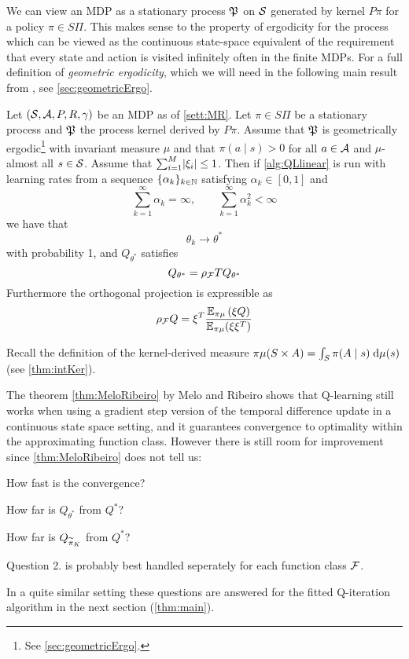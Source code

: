 We can view an MDP as a stationary process $\mathfrak{P}$ on $\mathcal{S}$
generated by kernel $P\pi$ for a policy $\pi \in S\Pi$.
This makes sense to the property of ergodicity for the process
which can be viewed as the continuous state-space equivalent of
the requirement that every state and action is visited infinitely often
in the finite MDPs.
For a full definition of \emph{geometric ergodicity}, which we will need
in the following main result from , see \cref{sec:geometricErgo}.

\begin{thm}
  Let $(\mathcal{S}, \mathcal{A}, P, R, \gamma)$ be an MDP as of \cref{sett:MR}.
  Let $\pi \in S\Pi$ be a stationary process
  and $\mathfrak{P}$ the process kernel derived by $P\pi$.
  Assume that $\mathfrak{P}$ is geometrically
  ergodic\footnote{See \cref{sec:geometricErgo}.} with invariant
  measure $\mu$ and that
  $\pi(a \mid s) > 0$ for all $a \in \mathcal{A}$ and $\mu$-almost all
  $s \in \mathcal{S}$.
  Assume that $\sum_{i=1}^M \abs{\xi_i} \leq 1$.
  Then if \cref{alg:QLlinear} is run with learning rates from a sequence
  $\{ \alpha_k \}_{k \in \mathbb{N}}$ satisfying $\alpha_k \in [0,1]$ and
  \[ \sum_{k = 1}^\infty \alpha_k = \infty, \qquad
  \sum_{k = 1}^\infty \alpha_k^2 < \infty \]
  we have that
  \[ \theta_k \to \theta^* \]
  with probability 1, and $Q_{\theta^*}$ satisfies
  \[ Q_{\theta^*} = \rho_\mathcal{F} T Q_{\theta^*} \]
  Furthermore the orthogonal projection is expressible as
  \[ \rho_\mathcal{F} Q = \xi^T
    \frac{\mathbb{E}_{\pi\mu}\left( \xi Q \right)}{\mathbb{E}_{\pi\mu} (\xi \xi^T)}
  \]
  \label{thm:MeloRibeiro}
\end{thm}
\begin{rem}
  Recall the definition of the kernel-derived measure $\pi \mu(S \times A)
  = \int_S \pi(A \mid s) \; \mathrm{d} \mu(s)$ (see \cref{thm:intKer}).
\end{rem}

The theorem \ref{thm:MeloRibeiro} by Melo and Ribeiro
shows that Q-learning still works when using a gradient step
version of the temporal difference update in a continuous state space setting,
and it guarantees convergence to optimality within the approximating function
class.
However there is still room for improvement since \cref{thm:MeloRibeiro}
does not tell us:
\begin{center}
\begin{enumerate*}[itemjoin=\hspace{0.3in}]
  \item How fast is the convergence?
  \item How far is $Q_{\theta^*}$ from $Q^*$?
    \label{item:linApprox1}
  \item How far is $Q_{\widetilde{\pi}_K}$ from $Q^*$?
\end{enumerate*}
\end{center}
\begin{rem}
  Question 2. is probably best handled seperately for each
    function class $\mathcal{F}$.
\end{rem}
In a quite similar setting these questions are answered for the
fitted Q-iteration algorithm in the next section (\cref{thm:main}).

